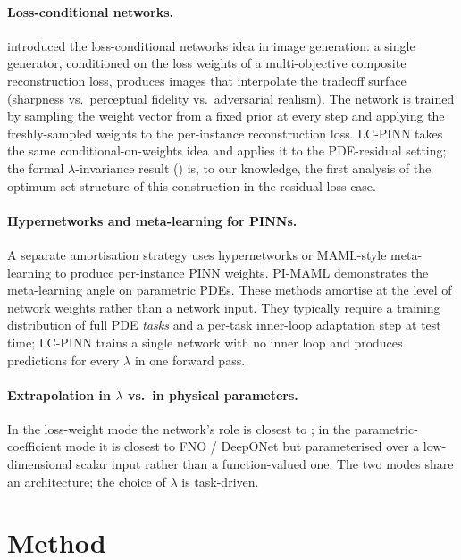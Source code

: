 \documentclass{article}
\theoremstyle{plain}
\theoremstyle{definition}
\theoremstyle{remark}
\begin{document}
\paragraph{Loss-conditional networks.}
\citet{dosovitskiy2020} introduced the loss-conditional networks idea
in image generation: a single generator, conditioned on the loss
weights of a multi-objective composite reconstruction loss, produces
images that interpolate the tradeoff surface (sharpness vs.\ perceptual
fidelity vs.\ adversarial realism). The network is trained by sampling
the weight vector from a fixed prior at every step and applying the
freshly-sampled weights to the per-instance reconstruction loss.
LC-PINN takes the same conditional-on-weights idea and applies it to
the PDE-residual setting; the formal $\lambda$-invariance result
() is, to our knowledge, the first analysis of the
optimum-set structure of this construction in the residual-loss
case.

\paragraph{Hypernetworks and meta-learning for PINNs.}
A separate amortisation strategy uses hypernetworks
\citep{ha2017hypernetworks} or MAML-style meta-learning
\citep{finn2017maml} to produce per-instance PINN weights. PI-MAML
\citep{liu2022pi-maml} demonstrates the meta-learning angle on
parametric PDEs. These methods amortise at the level of network
weights rather than a network input. They typically require a training
distribution of full PDE \emph{tasks} and a per-task inner-loop
adaptation step at test time; LC-PINN trains a single network with no
inner loop and produces predictions for every $\lambda$ in one forward
pass.

\paragraph{Extrapolation in $\lambda$ vs.\ in physical parameters.}
In the loss-weight mode the network's role is closest to
\citet{dosovitskiy2020}; in the parametric-coefficient mode it is
closest to FNO / DeepONet but parameterised over a low-dimensional
scalar input rather than a function-valued one. The two modes share
an architecture; the choice of $\lambda$ is task-driven.


\section{Method}
\label{sec:method}
\end{document}
